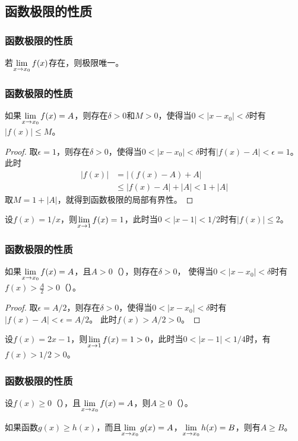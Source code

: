 \documentclass[14pt,notheorems,leqno,xcolor={rgb}]{beamer} %
\begin{document}
\subsection{函数极限的性质}

\setcounter{property}{0}

\begin{iframe}
\frametitle{函数极限的性质}
\begin{property}[唯一性]
若$\lim\limits_{x\to x_0}f(x)$存在，则极限唯一。
\end{property}
\end{iframe}

\begin{iframe}[shrink=4]
\frametitle{函数极限的性质}
\begin{property}[局部有界性]
如果$\lim\limits_{x\to x_0}f(x)=A$，则存在$\delta>0$和$M>0$，使得当$0<|x-x_0|<\delta$时有$|f(x)|\le M$。
\end{property}
\pause
\begin{proof}
取$\epsilon=1$，则存在$\delta>0$，使得当$0<|x-x_0|<\delta$时有$|f(x)-A|<\epsilon=1$。此时
\begin{align*}
|f(x)|&=|(f(x)-A)+A|\\
      &\le|f(x)-A|+|A|<1+|A|
\end{align*}
取$M=1+|A|$，就得到函数极限的局部有界性。
\end{proof}
\pause
\begin{example*}
设$f(x)=1/x$，则$\lim\limits_{x\to1}f(x)=1$，\pause 此时当$0<|x-1|<1/2$时有$|f(x)|\le2$。
\end{example*}
\end{iframe}

\begin{iframe}
\frametitle{函数极限的性质}
\begin{property}[局部保号性]
如果$\lim\limits_{x\to x_0}f(x)=A$，且$A>0$（），则存在$\delta>0$，
使得当$0<|x-x_0|<\delta$时有$f(x)>\frac A2>0$（）。
\end{property}
\vpause
\begin{proof}
取$\epsilon=A/2$，则存在$\delta>0$，使得当$0<|x-x_0|<\delta$时有$|f(x)-A|<\epsilon=A/2$。
此时$f(x)>A/2>0$。
\end{proof}
\vpause
\begin{example*}
设$f(x)=2x-1$，则$\lim\limits_{x\to1}f(x)=1>0$，\pause 此时当$0<|x-1|<1/4$时，有$f(x)>1/2>0$。
\end{example*}
\end{iframe}

\begin{frame}
\frametitle{函数极限的性质}
\begin{theorem*}[保号性]
设$f(x)\ge0$（），且$\lim\limits_{x\to x_0}f(x)=A$，则$A\ge0$（）。
\end{theorem*}
\vpause
\begin{corollary*}
如果函数$g(x)  \ge h(x)$，而且$\lim\limits_{x\to x_0}g(x)=A$，$\lim\limits_{x\to x_0}h(x)=B$，则有$A\ge B$。
\end{corollary*}
\end{frame}
\end{document}
